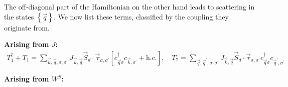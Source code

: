 \documentclass{revtex4-2}
\begin{document}
The off-diagonal part of the Hamiltonian on the other hand leads to scattering in the states \(\left\{ \vec q \right\} \). We now list these terms, classified by the coupling they originate from.
\par\noindent
{\bf Arising from \(J\):}
\begin{equation}\begin{aligned}
	T_1^\dagger + T_1 = \sum_{\vec k, \vec q, \sigma,\sigma^\prime}J_{\vec k, \vec q} \vec{S}_d\cdot\vec{\tau}_{\sigma,\sigma^\prime}\left[c^\dagger_{\vec q\sigma}c_{\vec k,\sigma^\prime} + \text{h.c.}\right],\quad T_7 = \sum_{\vec q, \vec q^\prime, \sigma,\sigma^\prime}J_{\vec k, \vec q} \vec{S}_d\cdot\vec{\tau}_{\sigma,\sigma^\prime}c^\dagger_{\vec q\sigma}c_{\vec q^\prime,\sigma^\prime}
\end{aligned}\end{equation}
\par\noindent
{\bf Arising from \(W^S\):}
\end{document}
